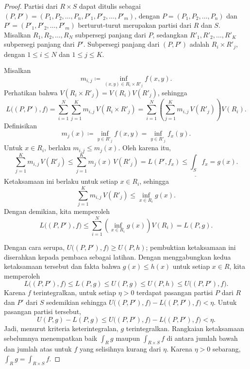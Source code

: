 \begin{proof}
Partisi dari $R \times S$ dapat ditulis sebagai
$(P,P') = (P_1,P_2,\ldots,P_n,P'_1,P'_2,\ldots,P'_m)$, dengan
$P = (P_1,P_2,\ldots,P_n)$ dan
$P' = (P'_1,P'_2,\ldots,P'_m)$ berturut-turut merupakan partisi dari $R$ dan
$S$. Misalkan $R_1,R_2,\ldots,R_N$ subpersegi panjang dari $P$, sedangkan
$R'_1,R'_2,\ldots,R'_K$ subpersegi panjang dari $P'$. Subpersegi panjang dari
$(P,P')$ adalah $R_i \times R'_j$, dengan $1 \leq i \leq N$ dan
$1 \leq j \leq K$.

Misalkan
\begin{equation*}
m_{i,j} \coloneqq
\inf_{(x,y) \in R_i \times R'_j} f(x,y) .
\end{equation*}
Perhatikan bahwa $V(R_i \times R'_j) = V(R_i)V(R'_j)$, sehingga
\begin{equation*}
L\bigl((P,P'),f\bigr) =
\sum_{i=1}^N
\sum_{j=1}^K
m_{i,j} \, V(R_i \times R'_j)
=
\sum_{i=1}^N
\left(
\sum_{j=1}^K
m_{i,j} \, V(R'_j) \right) V(R_i) .
\end{equation*}
Definisikan
\begin{equation*}
m_j(x) \coloneqq \inf_{y \in R'_j} f(x,y) = \inf_{y \in R'_j} f_x(y) .
\end{equation*}
Untuk $x \in R_i$, berlaku $m_{i,j} \leq m_j(x)$. Oleh karena itu,
\begin{equation*}
\sum_{j=1}^K
m_{i,j} \, V(R'_j)
\leq \sum_{j=1}^K m_j(x) \, V(R'_j) = L(P',f_x) \leq
\underline{\int_S} f_x = g(x) .
\end{equation*}
Ketaksamaan ini berlaku untuk setiap $x \in R_i$, sehingga
\begin{equation*}
\sum_{j=1}^K
m_{i,j} \, V(R'_j)
\leq \inf_{x \in R_i} g(x) .
\end{equation*}
Dengan demikian, kita memperoleh
\begin{equation*}
L\bigl((P,P'),f\bigr) 
\leq
\sum_{i=1}^N
\left(
\inf_{x \in R_i} g(x)
\right) V(R_i) = L(P,g) .
\end{equation*}

Dengan cara serupa, $U\bigl((P,P'),f\bigr) \geq U(P,h)$; pembuktian
ketaksamaan ini diserahkan kepada pembaca sebagai latihan. Dengan menggabungkan
kedua ketaksamaan tersebut dan fakta bahwa $g(x) \leq h(x)$ untuk setiap
$x \in R$, kita memperoleh
\begin{equation*}
L\bigl((P,P'),f\bigr)
\leq
L(P,g) \leq
U(P,g) \leq
U(P,h) \leq
U\bigl((P,P'),f\bigr) .
\end{equation*}
Karena $f$ terintegralkan, untuk setiap $\eta > 0$ terdapat pasangan partisi
$P$ dari $R$ dan $P'$ dari $S$ sedemikian sehingga
$U\bigl((P,P'),f\bigr)-L\bigl((P,P'),f\bigr)<\eta$. Untuk pasangan partisi
tersebut,
\begin{equation*}
U(P,g) - L(P,g)
\leq
U\bigl((P,P'),f\bigr) -
L\bigl((P,P'),f\bigr) < \eta .
\end{equation*}
Jadi, menurut kriteria keterintegralan, $g$ terintegralkan. Rangkaian
ketaksamaan sebelumnya menempatkan baik $\int_R g$ maupun
$\int_{R \times S} f$ di antara jumlah bawah dan jumlah atas untuk $f$ yang
selisihnya kurang dari $\eta$. Karena $\eta>0$ sebarang,
$\int_R g = \int_{R \times S} f$.


\end{proof}
